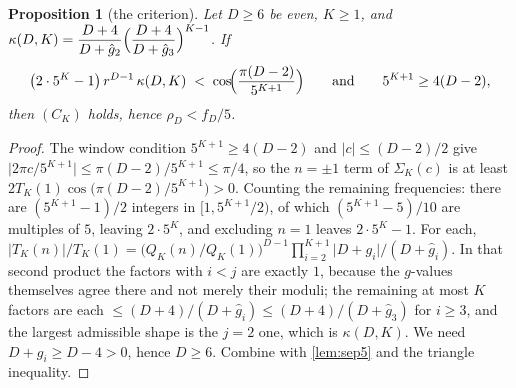 \documentclass[11pt]{amsart}
\newtheorem{proposition}[theorem]{Proposition}
\theoremstyle{definition}
\theoremstyle{remark}
\begin{document}
\begin{proposition}[the criterion]
\label{prop:crit5}
Let $D \ge 6$ be even, $K \ge 1$, and $\kappa(D,K) = \dfrac{D+4}{D+\hat g_2}\Bigl(\dfrac{D+4}{D+\hat g_3}\Bigr)^{K-1}$. If
\[
  \bigl(2\cdot 5^K - 1\bigr)\,r^{D-1}\,\kappa(D,K) \;<\; \cos\!\Bigl(\frac{\pi(D-2)}{5^{K+1}}\Bigr) \qquad\text{and}\qquad 5^{K+1} \ge 4(D-2),
\]
then $(C_K)$ holds, hence $\rho_D < f_D/5$.
\end{proposition}

\begin{proof}
The window condition $5^{K+1} \ge 4(D-2)$ and $\lvert c \rvert \le (D-2)/2$ give $\lvert 2\pi c/5^{K+1}\rvert \le \pi(D-2)/5^{K+1} \le \pi/4$, so the $n = \pm1$ term of $\Sigma_K(c)$ is at least $2T_K(1)\cos\bigl(\pi(D-2)/5^{K+1}\bigr) > 0$. Counting the remaining frequencies: there are $(5^{K+1}-1)/2$ integers in $[1, 5^{K+1}/2)$, of which $(5^{K+1}-5)/10$ are multiples of $5$, leaving $2\cdot 5^K$, and excluding $n=1$ leaves $2\cdot 5^K - 1$. For each, $\lvert T_K(n)\rvert/T_K(1) = \bigl(Q_K(n)/Q_K(1)\bigr)^{D-1}\prod_{i=2}^{K+1}\lvert D + g_i\rvert/(D+\hat g_i)$. In that second product the factors with $i < j$ are exactly $1$, because the $g$-values themselves agree there and not merely their moduli; the remaining at most $K$ factors are each $\le (D+4)/(D+\hat g_i) \le (D+4)/(D+\hat g_3)$ for $i \ge 3$, and the largest admissible shape is the $j = 2$ one, which is $\kappa(D,K)$. We need $D + g_i \ge D - 4 > 0$, hence $D \ge 6$. Combine with \cref{lem:sep5} and the triangle inequality.
\end{proof}
\end{document}
